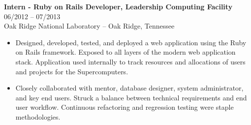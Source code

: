 \documentclass[12pt,letterpaper]{article}
\begin{document}
\noindent\textbf{Intern - Ruby on Rails Developer, Leadership Computing Facility}
\hfill{06/2012 -- 07/2013} \\
Oak Ridge National Laboratory -- Oak Ridge, Tennessee

\begin{itemize}

	\item Designed, developed, tested, and deployed a web application using the Ruby
	on Rails framework. Exposed to all layers of the modern web application stack.
  Application used internally to track resources and allocations
  of users and projects for the Supercomputers.

  \item Closely collaborated with mentor, database designer, system administrator,
  and key end users. Struck a balance between technical requirements and end user workflow.
  Continuous refactoring and regression testing were staple methodologies.


\end{itemize}


%
%
%
%


\end{document}
